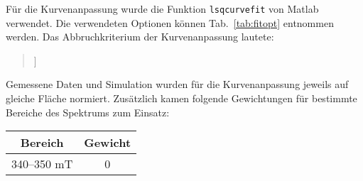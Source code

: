 \documentclass{article}
\newcommand{\matlab}{\textsf{Matlab}}
\begin{document}
\begin{center}
\setlength{\fboxsep}{1.5ex}\setlength{\fboxrule}{.75pt}
\end{center}

\clearpage


Für die Kurvenanpassung wurde die Funktion \texttt{lsqcurvefit} von \matlab{} verwendet. Die verwendeten Optionen können Tab.~\ref{tab:fitopt} entnommen werden. Das Abbruchkriterium der Kurvenanpassung lautete:

\begin{quote}\small
\ttfamily
[[@TSim.fit.fitreport.exitmessage]]
\end{quote}

Gemessene Daten und Simulation wurden für die Kurvenanpassung jeweils auf gleiche Fläche normiert. Zusätzlich kamen folgende Gewichtungen für bestimmte Bereiche des Spektrums zum Einsatz:

\begin{center}
\begin{tabular}{cc}
\toprule
\textbf{Bereich} & \textbf{Gewicht}
\\
\midrule
340--350 mT      & 0
\\
\bottomrule
\end{tabular}
\end{center}
\end{document}
